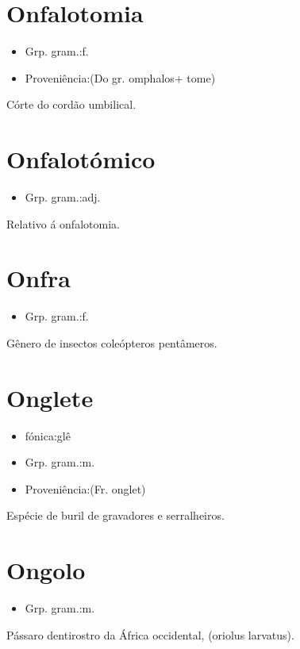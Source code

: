 \section{Onfalotomia}
\begin{itemize}
\item {Grp. gram.:f.}
\end{itemize}
\begin{itemize}
\item {Proveniência:(Do gr. \textunderscore omphalos\textunderscore  + \textunderscore tome\textunderscore )}
\end{itemize}
Córte do cordão umbilical.
\section{Onfalotómico}
\begin{itemize}
\item {Grp. gram.:adj.}
\end{itemize}
Relativo á onfalotomia.
\section{Onfra}
\begin{itemize}
\item {Grp. gram.:f.}
\end{itemize}
Gênero de insectos coleópteros pentâmeros.
\section{Onglete}
\begin{itemize}
\item {fónica:glê}
\end{itemize}
\begin{itemize}
\item {Grp. gram.:m.}
\end{itemize}
\begin{itemize}
\item {Proveniência:(Fr. \textunderscore onglet\textunderscore )}
\end{itemize}
Espécie de buril de gravadores e serralheiros.
\section{Ongolo}
\begin{itemize}
\item {Grp. gram.:m.}
\end{itemize}
Pássaro dentirostro da África occidental, (\textunderscore oriolus larvatus\textunderscore ).
